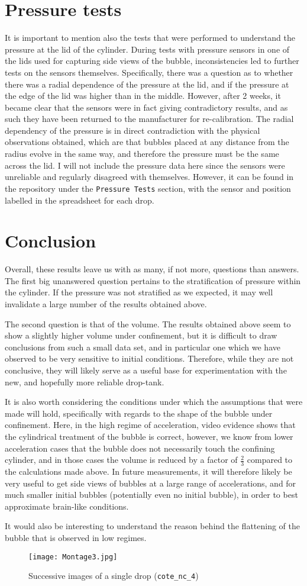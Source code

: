 \documentclass{article}
\begin{document}
\section{Pressure tests}
It is important to mention also the tests that were performed to understand the pressure at the lid of the cylinder. During tests with pressure sensors in one of the lids used for capturing side views of the bubble, inconsistencies led to further tests on the sensors themselves. Specifically, there was a question as to whether there was a radial dependence of the pressure at the lid, and if the pressure at the edge of the lid was higher than in the middle. However, after 2 weeks, it became clear that the sensors were in fact giving contradictory results, and as such they have been returned to the manufacturer for re-calibration. The radial dependency of the pressure is in direct contradiction with the physical observations obtained, which are that bubbles placed at any distance from the radius evolve in the same way, and therefore the pressure must be the same across the lid. I will not include the pressure data here since the sensors were unreliable and regularly disagreed with themselves. However, it can be found in the repository under the \texttt{Pressure Tests} section, with the sensor and position labelled in the spreadsheet for each drop.

\section{Conclusion}

Overall, these results leave us with as many, if not more, questions than answers. The first big unanswered question pertains to the stratification of pressure within the cylinder. If the pressure was not stratified as we expected, it may well invalidate a large number of the results obtained above.

The second question is that of the volume. The results obtained above seem to show a slightly higher volume under confinement, but it is difficult to draw conclusions from such a small data set, and in particular one which we have observed to be very sensitive to initial conditions. Therefore, while they are not conclusive, they will likely serve as a useful base for experimentation with the new, and hopefully more reliable drop-tank.

It is also worth considering the conditions under which the assumptions that were made will hold, specifically with regards to the shape of the bubble under confinement. Here, in the high regime of acceleration, video evidence shows that the cylindrical treatment of the bubble is correct, however, we know from lower acceleration cases that the bubble does not necessarily touch the confining cylinder, and in those cases the volume is reduced by a factor of $\frac{2}{3}$ compared to the calculations made above. In future measurements, it will therefore likely be very useful to get side views of bubbles at a large range of accelerations, and for much smaller initial bubbles (potentially even no initial bubble), in order to best approximate brain-like conditions.

It would also be interesting to understand the reason behind the flattening of the bubble that is observed in low regimes.

\begin{figure}[H]
    \centering
    \texttt{[image: Montage3.jpg]}
    \caption{Successive images of a single drop (\texttt{cote\_nc\_4})}
\end{figure}
\end{document}
